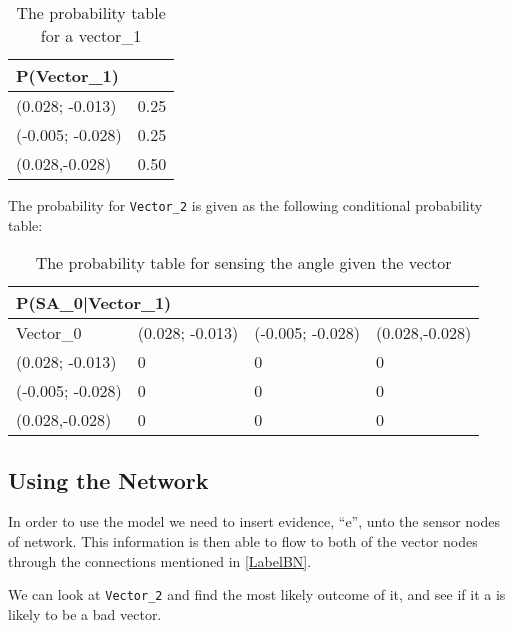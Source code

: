 \begin{center}
\begin{table}[H]
\label{Vector0_table}
\begin{tabular}{|l|l|}
\hline
P(Vector\_1) &\\ \hline
(0.028; -0.013) & 0.25   \\ \hline 
(-0.005; -0.028) & 0.25  \\ \hline
(0.028,-0.028)   & 0.50  \\ \hline
\end{tabular}
\caption{The probability table for a vector\_1}
\end{table}
\end{center}

The probability for \texttt{Vector\_2} is given as the following conditional
probability table: 
\begin{center}
\begin{table}[H]
\label{SAtable}
\begin{tabular}{|l|l|l|l|}
\hline
\multicolumn{4}{|l|}{P(SA\_0|Vector\_1)} \\ \hline
Vector\_0     & (0.028; -0.013) & (-0.005; -0.028) & (0.028,-0.028)  \\\hline   
(0.028; -0.013)   & 0 & 0    & 0    \\ \hline 
(-0.005; -0.028)    & 0 & 0    & 0    \\ \hline
(0.028,-0.028)   & 0    & 0    & 0   \\ \hline
\end{tabular}
\caption{The probability table for sensing the angle given the vector}
\end{table}
\end{center}


\subsection{Using the Network}

In order to use the model we need to insert evidence, ``e'', unto the sensor
nodes of network. This information is then able to flow to both of the vector
nodes through the connections mentioned in \autoref{LabelBN}.


We can look at \texttt{Vector\_2} and find the most likely outcome of it, and
see if it a is likely to be a bad vector.


